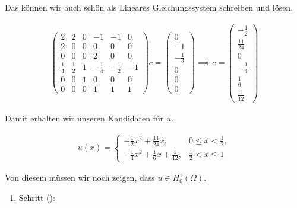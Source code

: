 \begin{solution}
Das können wir auch schön als Lineares Gleichungssystem schreiben und lösen.

\begin{align*}
  \begin{pmatrix}
    2 & 2 & 0 & -1 & -1 & 0 \\
    2 & 0 & 0 &  0 &  0 & 0 \\
    0 & 0 & 0 &  2 &  0 & 0 \\
    \frac{1}{4} & \frac{1}{2} & 1 & -\frac{1}{4} & -\frac{1}{2} & -1 \\
    0 & 0 & 1 &  0 &  0 & 0 \\
    0 & 0 & 0 &  1 &  1 & 1
  \end{pmatrix}
  c
  =
  \begin{pmatrix}
    0 \\ -1 \\ -\frac{1}{2} \\ 0 \\ 0 \\ 0
  \end{pmatrix}
  \implies
  c
  =
  \begin{pmatrix}
    -\frac{1}{2} \\ \frac{11}{24} \\ 0 \\ -\frac{1}{4} \\ \frac{1}{6} \\ \frac{1}{12}
  \end{pmatrix}
\end{align*}

Damit erhalten wir unseren Kandidaten für $u$.

\begin{align*}
  u(x)
  =
  \begin{cases}
    -\frac{1}{2} x^2 + \frac{11}{24} x,              & 0 \leq x < \frac{1}{2}, \\
    -\frac{1}{4} x^2 + \frac{1}{6} x + \frac{1}{12}, & \frac{1}{2} < x \leq 1
  \end{cases}
\end{align*}

Von diesem müssen wir noch zeigen, dass $u \in H_0^1(\Omega)$.

\begin{enumerate}[label = \arabic*.]

  \item Schritt ():

  \begin{enumerate}[label = (\roman*)]


\end{enumerate}
\end{enumerate}
\end{solution}
